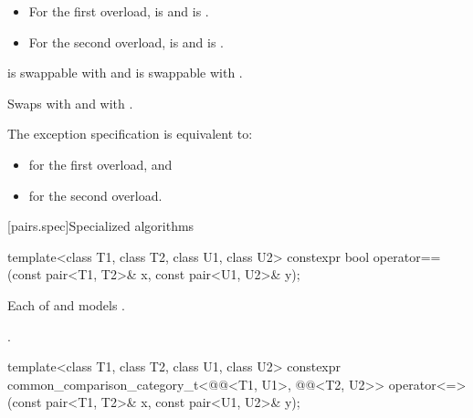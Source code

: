 \begin{itemdescr}
\pnum
\mandates
\begin{itemize}
\item
For the first overload,
 is  and
 is .
\item
For the second overload,
 is  and
 is .
\end{itemize}

\pnum
\expects
{} is swappable with  and
 is swappable with .

\pnum
\effects
Swaps
 with  and
 with .

\pnum
\remarks
The exception specification is equivalent to:
\begin{itemize}
\item
{}
for the first overload, and
\item
{}
for the second overload.
\end{itemize}
\end{itemdescr}

[pairs.spec]{Specialized algorithms}

%
\begin{itemdecl}
template<class T1, class T2, class U1, class U2>
  constexpr bool operator==(const pair<T1, T2>& x, const pair<U1, U2>& y);
\end{itemdecl}

\begin{itemdescr}
\pnum
\expects
Each of  and
 models .

\pnum
\returns
{}.
\end{itemdescr}

%
\begin{itemdecl}
template<class T1, class T2, class U1, class U2>
  constexpr common_comparison_category_t<@@<T1, U1>,
                                         @@<T2, U2>>
    operator<=>(const pair<T1, T2>& x, const pair<U1, U2>& y);
\end{itemdecl}

